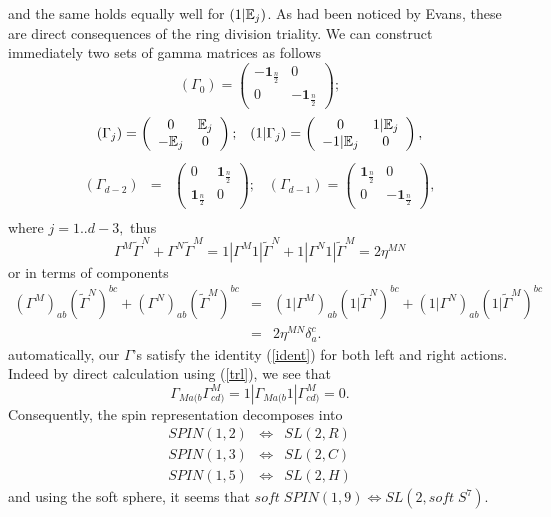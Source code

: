 \documentclass[a4paper,12pt]{book}
\begin{document}
and the same holds equally well for $(1|\Bbb{E}_{j})$. As had been noticed
by Evans, these are direct consequences of the ring division triality\cite
{r4}. We can construct immediately two sets of gamma matrices as follows 
\[
\left( \Gamma _{0}\right) =\left( 
\begin{array}{cc}
-\mathbf{1}_{\frac{n}{2}} & 0 \\ 
0 & -\mathbf{1}_{\frac{n}{2}}
\end{array}
\right) ; 
\]
\[
\left( \Gamma _{j}\right) =\left( 
\begin{array}{cc}
0 & \Bbb{E}_{j} \\ 
-\Bbb{E}_{j} & 0
\end{array}
\right) ;\;\;\;\left( 1|\Gamma _{j}\right) =\left( 
\begin{array}{cc}
0 & 1|\Bbb{E}_{j} \\ 
-1|\Bbb{E}_{j} & 0
\end{array}
\right) , 
\]
\begin{eqnarray}
\left( \Gamma _{d-2}\right) &=&\left( 
\begin{array}{cc}
0 & \mathbf{1}_{\frac{n}{2}} \\ 
\mathbf{1}_{\frac{n}{2}} & 0
\end{array}
\right) ;\;\;\;\left( \Gamma _{d-1}\right) =\left( 
\begin{array}{cc}
\mathbf{1}_{\frac{n}{2}} & 0 \\ 
0 & -\mathbf{1}_{\frac{n}{2}}
\end{array}
\right) ,  \nonumber \\
&&  \label{gmm}
\end{eqnarray}
where $j=1..d-3,$ thus 
\[
\Gamma ^{M}\tilde{\Gamma}^{N}+\Gamma ^{N}\tilde{\Gamma}^{M}=1|\Gamma ^{M}1|%
\tilde{\Gamma}^{N}+1|\Gamma ^{N}1|\tilde{\Gamma}^{M}=2\eta ^{MN} 
\]
or in terms of components 
\begin{eqnarray}
\left( \Gamma ^{M}\right) _{ab}\left( \tilde{\Gamma}^{N}\right) ^{bc}+\left(
\Gamma ^{N}\right) _{ab}\left( \tilde{\Gamma}^{M}\right) ^{bc} &=&\left(
1|\Gamma ^{M}\right) _{ab}\left( 1|\tilde{\Gamma}^{N}\right) ^{bc}+\left(
1|\Gamma ^{N}\right) _{ab}\left( 1|\tilde{\Gamma}^{M}\right) ^{bc}  \nonumber
\\
&=&2\eta ^{MN}\delta _{a}^{c}.
\end{eqnarray}
automatically, our $\Gamma $'s satisfy the identity (\ref{ident}) for both
left and right actions. Indeed by direct calculation using (\ref{trl}), we
see that 
\begin{equation}
\Gamma _{Ma(b}\Gamma _{cd)}^{M}=1|\Gamma _{Ma(b}1|\Gamma _{cd)}^{M}=0.
\end{equation}
Consequently, the spin representation decomposes into 
\begin{eqnarray}
SPIN\left( 1,2\right) &\Longleftrightarrow &SL\left( 2,R\right) \\
SPIN\left( 1,3\right) &\Longleftrightarrow &SL\left( 2,C\right) \\
SPIN\left( 1,5\right) &\Longleftrightarrow &SL\left( 2,H\right)
\end{eqnarray}
and using the soft sphere, it seems that $soft\;SPIN\left( 1,9\right)
\Longleftrightarrow SL\left( 2,soft\;S^{7}\right) $.
\end{document}
